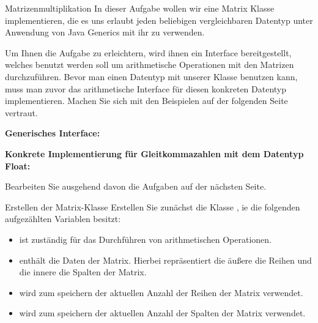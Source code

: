 \documentclass{../tuda-exercise}
\begin{document}
  \begin{task}[credit=\stars{3}{3}]{Matrizenmultiplikation}
    In dieser Aufgabe wollen wir eine Matrix Klasse implementieren, die es uns erlaubt jeden
    beliebigen vergleichbaren Datentyp unter Anwendung von Java Generics mit ihr zu verwenden.

    \br

    Um Ihnen die Aufgabe zu erleichtern, wird ihnen ein Interface bereitgestellt, welches benutzt
    werden soll um arithmetische Operationen mit den Matrizen durchzuführen. Bevor man einen
    Datentyp mit unserer  Klasse benutzen kann, muss man zuvor das
    arithmetische Interface für diesen konkreten Datentyp implementieren. Machen Sie sich mit den
    Beispielen auf der folgenden Seite vertraut.

    \br

    \textbf{Generisches Interface:}

    

    \clearpage

    \textbf{Konkrete Implementierung für Gleitkommazahlen mit dem Datentyp Float:}

    

    Bearbeiten Sie ausgehend davon die Aufgaben auf der nächsten Seite.

    \begin{subtask*}{Erstellen der Matrix-Klasse}
      Erstellen Sie zunächst die Klasse ,
      ie die folgenden aufgezählten Variablen besitzt:

      \begin{itemize}
        \item {} ist zuständig für das Durchführen von
        arithmetischen Operationen.
        \item {} enthält die Daten der Matrix.
        Hierbei repräsentiert die äußere  die Reihen und die innere
         die Spalten der Matrix.
        \item {} wird zum speichern der aktuellen Anzahl der Reihen
        der Matrix verwendet.
        \item {} wird zum speichern der aktuellen Anzahl der
        Spalten der Matrix verwendet.
      \end{itemize}


\end{subtask*}
\end{task}
\end{document}
